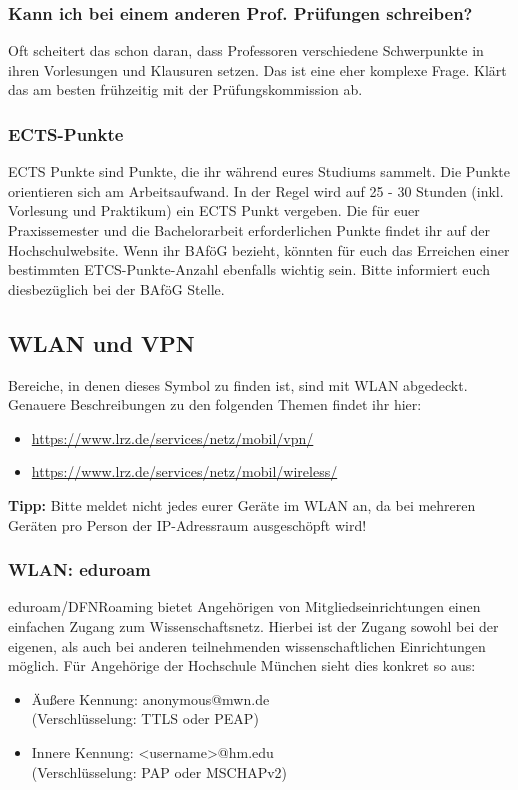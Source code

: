 \subsubsection{Kann ich bei einem anderen Prof. Prüfungen schreiben?}

Oft scheitert das schon daran, dass Professoren verschiedene Schwerpunkte in ihren Vorlesungen und Klausuren setzen. Das ist eine eher komplexe Frage. Klärt das am besten frühzeitig mit der Prüfungskommission ab.

\subsubsection{ECTS-Punkte}

ECTS Punkte sind Punkte, die ihr während eures Studiums sammelt. Die Punkte orientieren sich am Arbeitsaufwand. In der Regel wird auf 25 - 30 Stunden (inkl. Vorlesung und Praktikum) ein ECTS Punkt vergeben. Die für euer Praxissemester und die Bachelorarbeit erforderlichen Punkte findet ihr auf der Hochschulwebsite.\doublebreak
Wenn ihr BAföG bezieht, könnten für euch das Erreichen einer bestimmten ETCS-Punkte-Anzahl ebenfalls wichtig sein. Bitte informiert euch diesbezüglich bei der BAföG Stelle.

\subsection{WLAN und VPN}

Bereiche, in denen dieses Symbol zu finden ist, sind mit WLAN abgedeckt. Genauere Beschreibungen zu den folgenden Themen findet ihr hier:

\begin{itemize}
	\item{\url{https://www.lrz.de/services/netz/mobil/vpn/}}
	\item{\url{https://www.lrz.de/services/netz/mobil/wireless/}}
\end{itemize}
\textbf{Tipp:} Bitte meldet nicht jedes eurer Geräte im WLAN an, da bei mehreren Geräten pro Person der IP-Adressraum ausgeschöpft wird!

\subsubsection{WLAN: eduroam}

eduroam/DFNRoaming bietet Angehörigen von Mitgliedseinrichtungen einen einfachen Zugang zum Wissenschaftsnetz. Hierbei ist der Zugang sowohl bei der eigenen, als auch bei anderen teilnehmenden wissenschaftlichen Einrichtungen möglich.\doublebreak
Für Angehörige der Hochschule München sieht dies konkret so aus:
\begin{itemize}
		 \item{Äußere Kennung: anonymous@mwn.de\\ (Verschlüsselung: TTLS oder PEAP)}
		 \item{Innere Kennung: \textless username\textgreater @hm.edu\\ (Verschlüsselung: PAP oder MSCHAPv2)}
\end{itemize}


